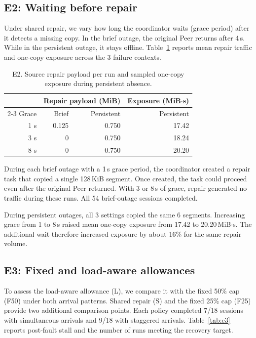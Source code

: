 \subsection{E2: Waiting before repair}
Under shared repair, we vary how long the coordinator waits (grace period) after it
detects a missing copy. In the brief outage, the original Peer returns
after 4\,s. While in the persistent outage, it stays offline.
Table~\ref{tab:e2} reports mean repair traffic and one-copy exposure
across the 3 failure contexts.

\begin{table}[ht]
\centering\small
\caption{E2. Source repair payload per run and sampled one-copy exposure
during persistent absence.}
\label{tab:e2}
\begin{tabular}{@{}r rr r@{}}
\toprule
 & \multicolumn{2}{c}{Repair payload (MiB)} & Exposure (MiB$\cdot$s) \\
\cmidrule(lr){2-3}
Grace & Brief & Persistent & Persistent \\
\midrule
1 s & 0.125 & 0.750 & 17.42 \\
3 s & 0 & 0.750 & 18.24 \\
8 s & 0 & 0.750 & 20.20 \\
\bottomrule
\end{tabular}
\end{table}

During each brief outage with a 1\,s grace period, the coordinator
created a repair task that copied a single 128\,KiB segment.
Once created, the task could proceed even after the original Peer returned.
With 3 or 8\,s of grace, repair generated no traffic during these runs.
All 54 brief-outage sessions completed.

During persistent outages, all 3 settings copied the same 6 segments.
Increasing grace from 1 to 8\,s raised mean one-copy exposure from 17.42
to 20.20\,MiB$\cdot$s. The additional wait therefore increased exposure
by about 16\% for the same repair volume.

\subsection{E3: Fixed and load-aware allowances}
To assess the load-aware allowance (L), we compare it with the fixed
50\% cap (F50) under both arrival patterns. Shared repair (S) and the
fixed 25\% cap (F25) provide two additional comparison points.
Each policy completed 7/18 sessions with simultaneous arrivals and 9/18
with staggered arrivals. Table~\ref{tab:e3} reports post-fault stall and
the number of runs meeting the recovery target.

